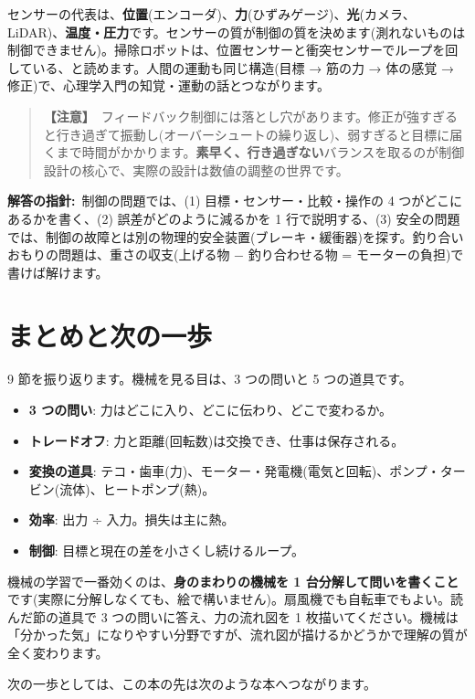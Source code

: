 \documentclass{article}
\begin{document}
センサーの代表は、\textbf{位置}(エンコーダ)、\textbf{力}(ひずみゲージ)、\textbf{光}(カメラ、LiDAR)、\textbf{温度・圧力}です。センサーの質が制御の質を決めます(測れないものは制御できません)。掃除ロボットは、位置センサーと衝突センサーでループを回している、と読めます。人間の運動も同じ構造(目標 → 筋の力 → 体の感覚 → 修正)で、心理学入門の知覚・運動の話とつながります。

\begin{quote}
\textbf{【注意】}\ フィードバック制御には落とし穴があります。修正が強すぎると行き過ぎて振動し(オーバーシュートの繰り返し)、弱すぎると目標に届くまで時間がかかります。\textbf{素早く、行き過ぎない}バランスを取るのが制御設計の核心で、実際の設計は数値の調整の世界です。
\end{quote}

\textbf{解答の指針:}\ 制御の問題では、(1) 目標・センサー・比較・操作の 4 つがどこにあるかを書く、(2) 誤差がどのように減るかを 1 行で説明する、(3) 安全の問題では、制御の故障とは別の物理的安全装置(ブレーキ・緩衝器)を探す。釣り合いおもりの問題は、重さの収支(上げる物 − 釣り合わせる物 = モーターの負担)で書けば解けます。

\section{まとめと次の一歩}

9 節を振り返ります。機械を見る目は、3 つの問いと 5 つの道具です。

\begin{itemize}
\item \textbf{3 つの問い}: 力はどこに入り、どこに伝わり、どこで変わるか。
\item \textbf{トレードオフ}: 力と距離(回転数)は交換でき、仕事は保存される。
\item \textbf{変換の道具}: テコ・歯車(力)、モーター・発電機(電気と回転)、ポンプ・タービン(流体)、ヒートポンプ(熱)。
\item \textbf{効率}: 出力 ÷ 入力。損失は主に熱。
\item \textbf{制御}: 目標と現在の差を小さくし続けるループ。
\end{itemize}

機械の学習で一番効くのは、\textbf{身のまわりの機械を 1 台分解して問いを書くこと}です(実際に分解しなくても、絵で構いません)。扇風機でも自転車でもよい。読んだ節の道具で 3 つの問いに答え、力の流れ図を 1 枚描いてください。機械は「分かった気」になりやすい分野ですが、流れ図が描けるかどうかで理解の質が全く変わります。

次の一歩としては、この本の先は次のような本へつながります。
\end{document}
